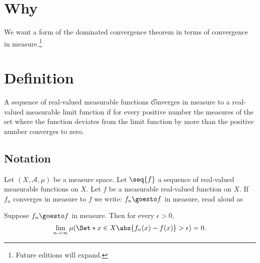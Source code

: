 

\section*{Why}

We want a form of the dominated convergence theorem in terms of convergence in measure.\footnote{Future editions will expand.}

\section*{Definition}

A sequence of real-valued measurable functions \t{converges in measure} to a real-valued measurable limit function if for every positive number the measures of the set where the function deviates from the limit function by more than the positive number converges to zero.

\subsection*{Notation}

Let $(X, \mathcal{A} , \mu )$ be a measure space.
Let $\seq{f}$ a sequence of real-valued measurable functions on $X$.
Let $f$ be a measurable real-valued function on $X$.
If $f_n$ converges in measure to $f$ we write: $f_n \goesto f$ in measure, read aloud as 

Suppose $f_n \goesto f$ in measure.
Then for every $\epsilon  > 0$,
    \[
\lim_{n \to \infty} \mu (\Set*{x \in X}{\abs{f_n(x) - f(x)} > \epsilon }) = 0.
    \]

\blankpage